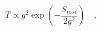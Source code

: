 \begin{equation}
T\propto g^2 \exp{\left(-\frac{S_{inst}}{2 g^2}\right)}\quad,
\label{tension}
\end{equation}

